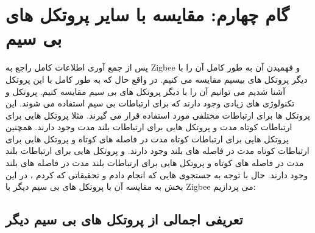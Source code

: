 \def \Subject {گام چهارم: مقایسه با سایر پروتکل های بی سیم}
\section{\Subject}
پس از جمع آوری اطلاعات کامل راجع به Zigbee و فهمیدن آن به طور کامل آن را با دیگر پروتکل های بیسیم مقایسه می کنیم.
در واقع حال که به طور کامل با این پروتکل آشنا شدیم می توانیم آن را با دیگر پروتکل های بی سیم مقایسه کنیم.
پروتکل و تکنولوژی های زیادی وجود دارند که برای ارتباطات بی سیم استفاده می شوند.
این پروتکل ها برای ارتباطات مختلفی مورد استفاده قرار می گیرند.
مثلا پروتکل هایی برای ارتباطات کوتاه مدت و پروتکل هایی برای ارتباطات بلند مدت وجود دارند.
همچنین پروتکل هایی برای ارتباطات کوتاه مدت در فاصله های کوتاه و پروتکل هایی برای ارتباطات کوتاه مدت در فاصله های بلند وجود دارند.
و پروتکل هایی برای ارتباطات بلند مدت در فاصله های کوتاه و پروتکل هایی برای ارتباطات بلند مدت در فاصله های بلند وجود دارند.
حال با توجه به جستجوی هایی که انجام دادم و تحقیقاتی که کردم ،
در این بخش به مقایسه آن با پروتکل های بی سیم دیگر با Zigbee می پردازیم:

\subsection{تعریفی اجمالی از پروتکل های بی سیم دیگر}

